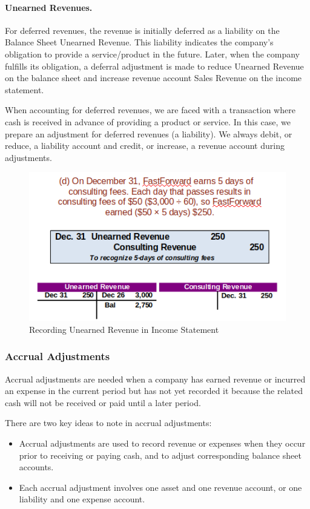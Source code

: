 \documentclass[../main.tex]{subfiles}
\begin{document}
	\paragraph{Unearned Revenues.} For deferred revenues, the revenue is 
	initially deferred 
	as a liability on 
	the Balance Sheet \ie Unearned Revenue. This liability indicates the 
	company's obligation to provide a service/product in the future. Later, 
	when the company fulfills its obligation, a deferral adjustment is made to 
	reduce Unearned Revenue on the balance sheet and increase revenue account 
	\eg Sales Revenue on the income statement.
	
	When accounting for deferred revenues, we are faced with a transaction 
	where cash is received in advance of providing a product or service. In 
	this case, we prepare an adjustment for deferred revenues (a liability).  
	We always debit, or reduce, a liability account and credit, or increase, a 
	revenue account during adjustments.
	
 	\begin{figure}[ht]
	 	\centering
	 	\includegraphics[width=0.9\columnwidth]{images/c3/unearned_revenue_income.png}
	 	\caption{Recording Unearned Revenue in Income Statement}	
	 \end{figure}
	
	\subsubsection{Accrual Adjustments}
	
	Accrual adjustments are needed when a company has earned revenue or 
	incurred an expense in the current period but has not yet recorded it 
	because the related cash will not be received or paid until a later period.
	
	There are two key ideas to note in accrual adjustments:
	\begin{itemize}[noitemsep]
		\item Accrual adjustments are used to record revenue or expenses when 
		they occur prior to receiving or paying cash, and to adjust 
		corresponding balance sheet accounts.
		\item Each accrual adjustment involves one asset and one revenue 
		account, or one liability and one expense account.
	\end{itemize}
	
\end{document}
